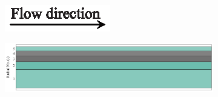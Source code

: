 \documentclass[preprint,12pt]{elsarticle}
\begin{document}
\begin{figure}
     \centering
     \begin{subfigure}[b]{\textwidth}
     	\includegraphics[width=\textwidth]{flow_dir.eps}
     \end{subfigure}
     \begin{subfigure}[b]{0.85\textwidth}
\includegraphics[width=\textwidth]{results/segments/5segEq/60C40T/seg.png}
     \end{subfigure}
     \hfill
     \begin{subfigure}[b]{0.1\textwidth}

\end{subfigure}
\end{figure}
\end{document}

